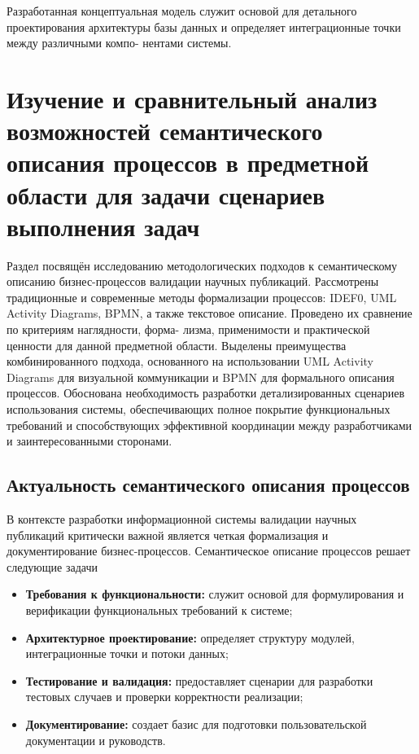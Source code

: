 Разработанная концептуальная модель служит основой для детального проектирования
архитектуры базы данных и определяет интеграционные точки между различными компо-
нентами системы.

\section{Изучение и сравнительный анализ возможностей семантического 
описания процессов в предметной области для задачи сценариев выполнения задач}

\begin{annotation}
	Раздел посвящён исследованию методологических подходов к семантическому 
	описанию бизнес-процессов валидации научных публикаций. Рассмотрены традиционные
	и современные методы формализации процессов: IDEF0, UML Activity Diagrams, BPMN, а
	также текстовое описание. Проведено их сравнение по критериям наглядности, форма-
	лизма, применимости и практической ценности для данной предметной области. Выделены
	преимущества комбинированного подхода, основанного на использовании UML Activity
	Diagrams для визуальной коммуникации и BPMN для формального описания процессов. 
	Обоснована необходимость разработки детализированных сценариев использования системы,
	обеспечивающих полное покрытие функциональных требований и способствующих эффективной 
	координации между разработчиками и заинтересованными сторонами.
\end{annotation}

\subsection{Актуальность семантического описания процессов}
В контексте разработки информационной системы валидации научных публикаций критически
важной является четкая формализация и документирование бизнес-процессов. Семантическое
описание процессов решает следующие задачи

\begin{itemize}
	\item \textbf{Требования к функциональности:} служит основой для формулирования и верификации функциональных требований к системе;
	\item \textbf{Архитектурное проектирование:} определяет структуру модулей, интеграционные точки и потоки данных;
	\item \textbf{Тестирование и валидация:} предоставляет сценарии для разработки тестовых случаев и проверки корректности реализации;
	\item \textbf{Документирование:} создает базис для подготовки пользовательской документации и руководств.
\end{itemize}


